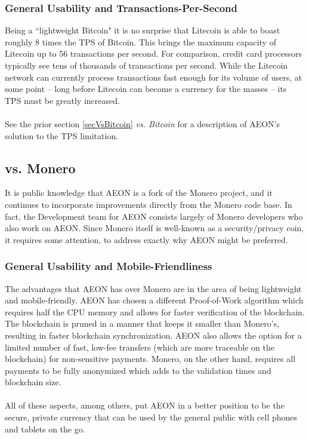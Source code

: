 \subsubsection{General Usability and Transactions-Per-Second}
Being a “lightweight Bitcoin" it is no surprise that Litecoin is able to boast roughly 8 times the TPS of Bitcoin.  This brings the maximum capacity of Litecoin up to 56 transactions per second. For comparison, credit card processors typically see tens of thousands of transactions per second. While the Litecoin network can currently process transactions fast enough for its volume of users, at some point -- long before Litecoin can become a currency for the masses -- its TPS must be greatly increased.\\
\\
See the prior section \ref{secVsBitcoin} \textit{vs. Bitcoin} for a description of AEON's solution to the TPS limitation.

\subsection{vs. Monero}
It is public knowledge that AEON is a fork of the Monero project, and it continues to incorporate improvements directly from the Monero code base.  In fact, the Development team for AEON consists largely of Monero developers who also work on AEON.  Since Monero itself is well-known as a security/privacy coin, it requires some attention, to address exactly why AEON might be preferred.

\subsubsection{General Usability and Mobile-Friendliness}
The advantages that AEON has over Monero are in the area of being lightweight and mobile-friendly.  AEON has chosen a different Proof-of-Work algorithm which requires half the CPU memory and allows for faster verification of the blockchain.  The blockchain is pruned in a manner that keeps it smaller than Monero's, resulting in faster blockchain synchronization.  AEON also allows the option for a limited number of fast, low-fee transfers (which are more traceable on the blockchain) for non-sensitive payments.  Monero, on the other hand, requires all payments to be fully anonymized which adds to the validation times and blockchain size.\\
\\
All of these aspects, among others, put AEON in a better position to be the secure, private currency that can be used by the general public with cell phones and tablets on the go.

